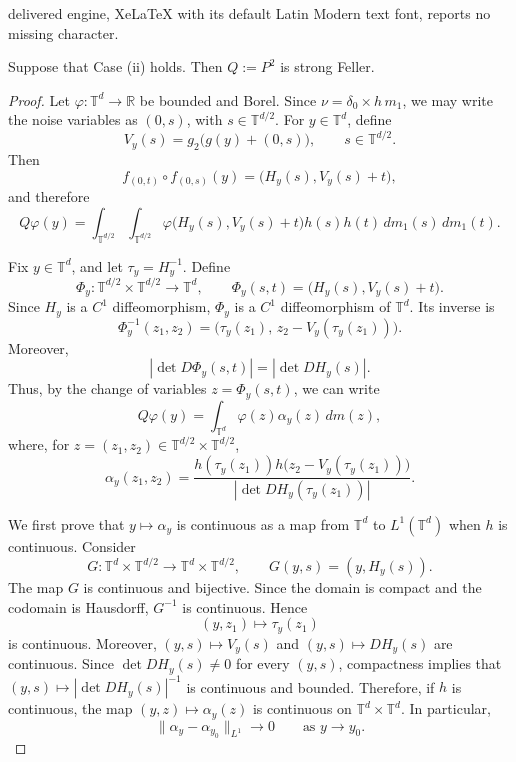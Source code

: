 \documentclass[10pt,a4paper]{amsart}
\newcommand{\Rr}{{\mathbb{R}}}
\newcommand{\Tt}{{\mathbb{T}}}
\begin{document}
delivered engine, XeLaTeX with its default Latin Modern text font, reports no missing character.
\begin{lemma}
\label{lem:strong-feller-singular}
Suppose that Case (ii) holds. Then $Q:=P^2$ is strong Feller.
\end{lemma}

\begin{proof}
Let $\varphi\colon\Tt^d\to\Rr$ be bounded and Borel. Since $\nu=\delta_0\times h\,m_1$, we may write the noise variables as $(0,s)$, with $s\in\Tt^{d/2}$. For $y\in\Tt^d$, define
\[
V_y(s)=g_2\bigl(g(y)+(0,s)\bigr),
\qquad s\in\Tt^{d/2}.
\]
Then
\[
f_{(0,t)}\circ f_{(0,s)}(y)
=
\bigl(H_y(s),V_y(s)+t\bigr),
\]
and therefore
\[
Q\varphi(y)
=
\int_{\Tt^{d/2}}\int_{\Tt^{d/2}}
\varphi\bigl(H_y(s),V_y(s)+t\bigr)h(s)h(t)\,dm_1(s)\,dm_1(t).
\]

Fix $y\in\Tt^d$, and let $\tau_y=H_y^{-1}$. Define
\[
\Phi_y\colon\Tt^{d/2}\times\Tt^{d/2}\to\Tt^d, \qquad \Phi_y(s,t)=\bigl(H_y(s),V_y(s)+t\bigr).
\]
Since $H_y$ is a $C^1$ diffeomorphism, $\Phi_y$ is a $C^1$ diffeomorphism of $\Tt^d$. Its inverse is
\[
\Phi_y^{-1}(z_1,z_2)
=
\bigl(\tau_y(z_1),\,z_2-V_y(\tau_y(z_1))\bigr).
\]
Moreover,
\[
\left|\det D\Phi_y(s,t)\right|
=
\left|\det DH_y(s)\right|.
\]
Thus, by the change of variables $z=\Phi_y(s,t)$, we can write
\[
Q\varphi(y)
=
\int_{\Tt^d}\varphi(z)\alpha_y(z)\,dm(z),
\]
where, for $z=(z_1,z_2)\in\Tt^{d/2}\times\Tt^{d/2}$,
\[
\alpha_y(z_1,z_2)
=
\frac{
h(\tau_y(z_1))
h\bigl(z_2-V_y(\tau_y(z_1))\bigr)
}{
\left|\det DH_y(\tau_y(z_1))\right|
}.
\]

We first prove that $y\mapsto\alpha_y$ is continuous as a map from $\Tt^d$ to $L^1(\Tt^d)$ when $h$ is continuous. Consider
\[
G\colon\Tt^d\times\Tt^{d/2}\to\Tt^d\times\Tt^{d/2},
\qquad
G(y,s)=(y,H_y(s)).
\]
The map $G$ is continuous and bijective. Since the domain is compact and the codomain is Hausdorff, $G^{-1}$ is continuous. Hence
\[
(y,z_1)\mapsto \tau_y(z_1)
\]
is continuous. Moreover, $(y,s)\mapsto V_y(s)$ and $(y,s)\mapsto DH_y(s)$ are continuous. Since $\det DH_y(s)\neq 0$ for every $(y,s)$, compactness implies that
$(y,s)\mapsto \left|\det DH_y(s)\right|^{-1}$ is continuous and bounded. Therefore, if $h$ is continuous, the map $(y,z)\mapsto \alpha_y(z)$ is continuous on $\Tt^d\times\Tt^d$. In particular,
\[
\|\alpha_y-\alpha_{y_0}\|_{L^1}\longrightarrow 0
\qquad\text{as }y\to y_0.
\]


\end{proof}
\end{document}
